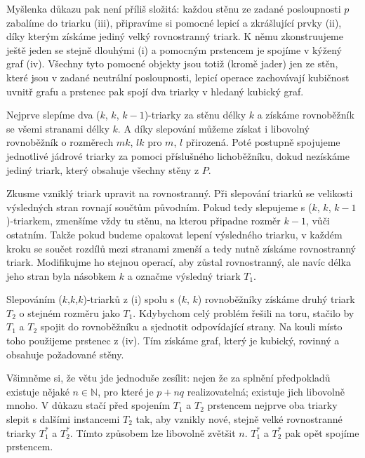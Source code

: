 Myšlenka důkazu pak není příliš složitá: každou stěnu ze zadané posloupnosti $p$ zabalíme do triarku (iii), připravíme si pomocné lepicí a zkrášlující prvky (ii), díky kterým získáme jediný velký rovnostranný triark. K němu zkonstruujeme ještě jeden se stejně dlouhými (i) a pomocným prstencem je spojíme v kýžený graf (iv). Všechny tyto pomocné objekty jsou totiž (kromě jader) jen ze stěn, které jsou v zadané neutrální posloupnosti, lepicí operace zachovávají kubičnost uvnitř grafu a prstenec pak spojí dva triarky v hledaný kubický graf.
\begin{dukaz}
Nejprve slepíme dva ($k$, $k$, $k-1$)-triarky za stěnu délky $k$ a získáme rovnoběžník se všemi stranami délky $k$. A díky slepování můžeme získat i libovolný rovnoběžník o rozměrech $mk$, $lk$ pro $m$, $l$ přirozená. Poté postupně spojujeme jednotlivé jádrové triarky za pomoci příslušného lichoběžníku, dokud nezískáme jediný triark, který obsahuje všechny stěny z $P$.

Zkusme vzniklý triark upravit na rovnostranný. Při slepování triarků se velikosti výsledných stran rovnají součtům původním. Pokud tedy slepujeme s ($k$, $k$, $k-1$)-triarkem, zmenšíme vždy tu stěnu, na kterou připadne rozměr $k-1$, vůči ostatním. Takže pokud budeme opakovat lepení výsledného triarku, v každém kroku se součet rozdílů mezi stranami zmenší a tedy nutně získáme rovnostranný triark. Modifikujme ho stejnou operací, aby zůstal rovnostranný, ale navíc délka jeho stran byla násobkem $k$ a označme výsledný triark $T_1$.

Slepováním ($k$,$k$,$k$)-triarků z (i) spolu s ($k$, $k$) rovnoběžníky získáme druhý triark $T_2$ o stejném rozměru jako $T_1$. Kdybychom celý problém řešili na toru, stačilo by $T_1$ a $T_2$ spojit do rovnoběžníku a sjednotit odpovídající strany. Na kouli místo toho použijeme prstenec z (iv). Tím získáme graf, který je kubický, rovinný a obsahuje požadované stěny. 
\end{dukaz}

Všimněme si, že větu jde jednoduše zesílit: nejen že za splnění předpokladů existuje nějaké $n \in \mathbb{N}$, pro které je $p+nq$ realizovatelná; existuje jich libovolně mnoho. V důkazu stačí před spojením $T_1$ a $T_2$ prstencem nejprve oba triarky slepit s dalšími instancemi $T_2$ tak, aby vznikly nové, stejně velké rovnostranné triarky $T_{1}^*$ a $T_{2}^*$. Tímto způsobem lze libovolně zvětšit $n$. $T_{1}^*$ a $T_{2}^*$ pak opět spojíme prstencem.